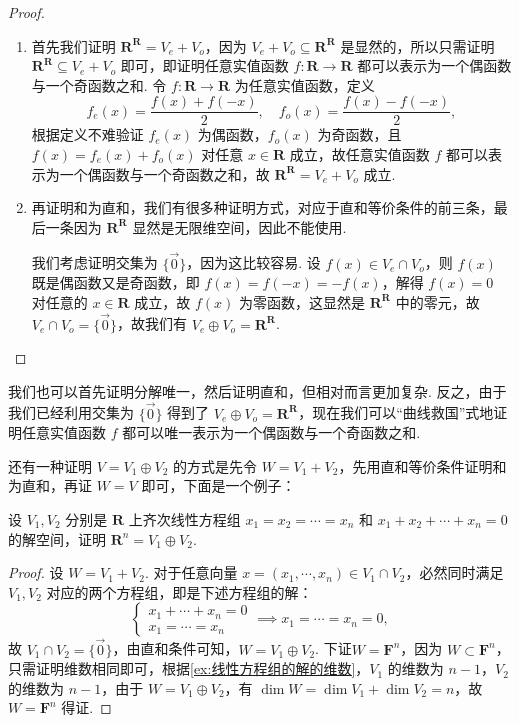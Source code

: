 \begin{proof}
    \begin{enumerate}
        \item 首先我们证明 $\mathbf{R}^\mathbf{R} = V_e + V_o$，因为 $V_e + V_o \subseteq \mathbf{R}^\mathbf{R}$ 是显然的，所以只需证明 $\mathbf{R}^\mathbf{R} \subseteq V_e + V_o$ 即可，即证明任意实值函数 $f: \mathbf{R} \to \mathbf{R}$ 都可以表示为一个偶函数与一个奇函数之和. 令 $f: \mathbf{R} \to \mathbf{R}$ 为任意实值函数，定义
        \[ f_e(x) = \frac{f(x) + f(-x)}{2}, \quad f_o(x) = \frac{f(x) - f(-x)}{2}, \]
        根据定义不难验证 $f_e(x)$ 为偶函数，$f_o(x)$ 为奇函数，且 $f(x) = f_e(x) + f_o(x)$ 对任意 $x \in \mathbf{R}$ 成立，故任意实值函数 $f$ 都可以表示为一个偶函数与一个奇函数之和，故 $\mathbf{R}^\mathbf{R} = V_e + V_o$ 成立.
        \item 再证明和为直和，我们有很多种证明方式，对应于直和等价条件的前三条，最后一条因为 $\mathbf{R}^\mathbf{R}$ 显然是无限维空间，因此不能使用.

        我们考虑证明交集为 $\{\vec{0}\}$，因为这比较容易. 设 $f(x) \in V_e \cap V_o$，则 $f(x)$ 既是偶函数又是奇函数，即 $f(x) = f(-x) = -f(x)$，解得 $f(x) = 0$ 对任意的 $x \in \mathbf{R}$ 成立，故 $f(x)$ 为零函数，这显然是 $\mathbf{R}^\mathbf{R}$ 中的零元，故 $V_e \cap V_o = \{\vec{0}\}$，故我们有 $V_e \oplus V_o = \mathbf{R}^\mathbf{R}$.
    \end{enumerate}
\end{proof}

我们也可以首先证明分解唯一，然后证明直和，但相对而言更加复杂. 反之，由于我们已经利用交集为 $\{\vec{0}\}$ 得到了 $V_e \oplus V_o = \mathbf{R}^\mathbf{R}$，现在我们可以``曲线救国''式地证明任意实值函数 $f$ 都可以唯一表示为一个偶函数与一个奇函数之和.

还有一种证明 $V = V_1 \oplus V_2$ 的方式是先令 $W = V_1 + V_2$，先用直和等价条件证明和为直和，再证 $W = V$ 即可，下面是一个例子：
\begin{example}{}{}
    设 $V_1, V_2$ 分别是 $\mathbf{R}$ 上齐次线性方程组 $x_1 = x_2 = \cdots = x_n$ 和 $x_1 + x_2 + \cdots + x_n = 0$ 的解空间，证明 $\mathbf{R}^n = V_1 \oplus V_2$.
\end{example}

\begin{proof}
    设 $W = V_1 + V_2$. 对于任意向量 $x = (x_1,\cdots,x_n) \in V_1 \cap V_2$，必然同时满足 $V_1, V_2$ 对应的两个方程组，即是下述方程组的解：
    \[\begin{cases}
            x_1 + \cdots + x_n = 0 \\
            x_1= \cdots = x_n
        \end{cases} \implies x_1 = \cdots = x_n = 0,\]
    故 $V_1 \cap V_2 = \{\vec{0}\}$，由直和条件可知，$W = V_1 \oplus V_2$. 下证$W = \mathbf{F}^n$，因为 $W \subset \mathbf{F}^n$，只需证明维数相同即可，根据\autoref{ex:线性方程组的解的维数}，$V_1$ 的维数为 $n - 1$，$V_2$ 的维数为 $n - 1$，由于 $W = V_1 \oplus V_2$，有 $\dim W = \dim V_1 + \dim V_2 = n$，故 $W = \mathbf{F}^n$ 得证.
\end{proof}

